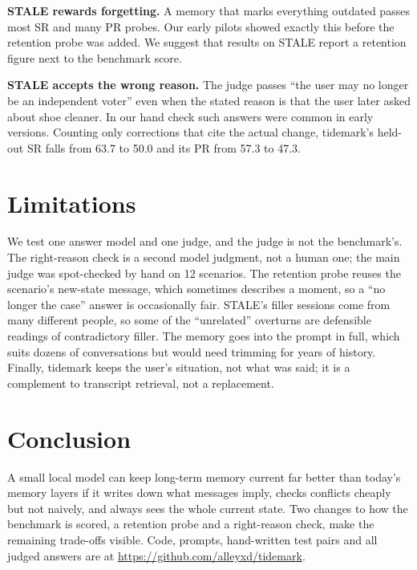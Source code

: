 \documentclass[10pt,twocolumn]{article}
\begin{document}
\textbf{STALE rewards forgetting.} A memory that marks everything outdated passes most SR and many PR probes. Our
early pilots showed exactly this before the retention probe was added. We suggest that results on STALE report a
retention figure next to the benchmark score.

\textbf{STALE accepts the wrong reason.} The judge passes ``the user may no longer be an independent voter'' even when
the stated reason is that the user later asked about shoe cleaner. In our hand check such answers were common in early
versions. Counting only corrections that cite the actual change, tidemark's held-out SR falls from 63.7 to 50.0 and its PR
from 57.3 to 47.3.

\section{Limitations}

We test one answer model and one judge, and the judge is not the benchmark's. The right-reason check is a second
model judgment, not a human one; the main judge was spot-checked by hand on 12 scenarios. The retention probe reuses
the scenario's new-state message, which sometimes describes a moment, so a ``no longer the case'' answer is
occasionally fair. STALE's filler sessions come from many different people, so some of the ``unrelated'' overturns are
defensible readings of contradictory filler. The memory goes into the prompt in full, which suits dozens of
conversations but would need trimming for years of history. Finally, tidemark keeps the user's situation, not what was
said; it is a complement to transcript retrieval, not a replacement.

\section{Conclusion}

A small local model can keep long-term memory current far better than today's memory layers if it writes down what
messages imply, checks conflicts cheaply but not naively, and always sees the whole current state. Two changes to how
the benchmark is scored, a retention probe and a right-reason check, make the remaining trade-offs visible. Code,
prompts, hand-written test pairs and all judged answers are at \url{https://github.com/alleyxd/tidemark}.
\end{document}
